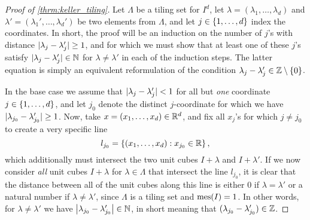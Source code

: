 \documentclass[../thesis.tex]{subfiles}
\begin{document}
\begin{proof}[Proof of \cref{thrm:keller_tiling}]
    Let $\Lambda$ be a tiling set for $I^d$, let $\lambda = (\lambda_1,\dots,\lambda_d)$ and $\lambda' = (\lambda_1',\dots,\lambda_d')$ be two elements from $\Lambda$, and let $j\in\{1,\dots, d\}$ index the coordinates. In short, the proof will be an induction on the number of $j$'s with distance $|\lambda_j-\lambda_j'|\geq 1$, and for which we must show that at least one of these $j$'s satisfy $|\lambda_{j}-\lambda_{j}'| \in \mathbb{N}$ for $\lambda \neq \lambda'$ in each of the induction steps. The latter equation is simply an equivalent reformulation of the condition $\lambda_{j}-\lambda_{j}' \in \mathbb{Z}\setminus\{0\}$.

    In the base case we assume that $|\lambda_j-\lambda_j' |< 1 $ for all but \emph{one} coordinate $j\in \{1,\dots,d\}$, and let $j_0$ denote the distinct $j$-coordinate for which we have $|\lambda_{j_0}-\lambda_{j_0}'| \geq 1$. Now, take $x=(x_1,\dots,x_d)\in \mathbb{R}^d$, and fix all $x_j$'s for which $j\neq j_0$ to create a very specific line
    \begin{equation*}
        l_{j_0} = \left\{\left(x_1,\dots,x_d\right) : x_{j_0} \in \mathbb{R} \right\},
    \end{equation*}
    which additionally must intersect the two unit cubes $I+\lambda$ and $I+\lambda'$. If we now consider \emph{all} unit cubes $I+\lambda$ for $\lambda \in \Lambda$ that intersect the line $l_{j_0}$, it is clear that the distance between all of the unit cubes along this line is either $0$ if $\lambda=\lambda'$ or a natural number if $\lambda \neq \lambda'$, since $\Lambda$ is a tiling set and $\operatorname{mes}(I)=1$. In other words, for $\lambda \neq \lambda'$ we have $\left|\lambda_{j_0}-\lambda_{j_0}'\right| \in \mathbb{N}$, in short meaning that $(\lambda_{j_0}-\lambda_{j_0}')\in \mathbb{Z}$.


\end{proof}
\end{document}
